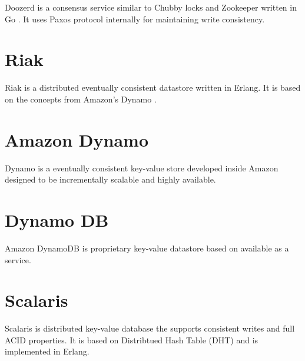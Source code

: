 Doozerd \citep{doozerd} is a consensus service similar to Chubby locks
 and Zookeeper  written in 
Go \citep{golang}. It uses Paxos protocol internally for maintaining
write consistency.

\section{Riak}

Riak \citep{riak} is a distributed eventually consistent datastore written in 
Erlang. It is based on the concepts from Amazon's Dynamo \citep{DeCandia07}.

\section{Amazon Dynamo}

Dynamo \citep{DeCandia07} is a eventually consistent key-value store developed 
inside Amazon designed to be incrementally scalable and highly available.

\section{Dynamo DB}

Amazon DynamoDB \citep{dynamoDB} is proprietary key-value datastore based on
\citet{DeCandia07} available as a service.

\section{Scalaris}

Scalaris \citep{scalaris} is distributed key-value database the supports
consistent writes and full ACID properties. It is based on Distribtued Hash
Table (DHT)%
and is implemented in Erlang.



